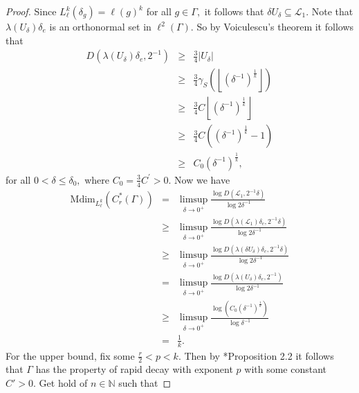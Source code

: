 \documentclass[a4paper,11pt,reqno]{amsart}
\theoremstyle{plain}
\theoremstyle{mainthmstyle}
\theoremstyle{named}
\numberwithin{equation}{section}
\newcommand{\Bea}{\begin{eqnarray*}}
\newcommand{\Eea}{\end{eqnarray*}}
\begin{document}
\begin{proof}
Since $L_{\ell}^{k} \left (\delta_{g} \right ) = \ell (g)^{k}$ for all $g \in \Gamma,$ it follows that $\delta U_{\delta} \subseteq \mathcal L_{1}.$ 
Note that $\lambda \left (U_{\delta} \right ) \delta_e$ is an orthonormal set in $\ell^2 (\Gamma).$ So by Voiculescu's theorem it follows that 
\Bea 
D \left (\lambda(U_{\delta})\delta_{e}, 2^{-1} \right ) 
& \geq & \frac {3} {4} \left \lvert U_{\delta} \right \rvert \\ 
& \geq & \frac {3} {4} \gamma_S \left (\left \lfloor \left (\delta^{-1} \right )^{\frac {1} {k}} \right \rfloor \right ) \\ 
& \geq & \frac {3} {4} C \left \lfloor \left (\delta^{-1} \right )^{\frac {1} {k}} \right \rfloor \\ & \geq & \frac {3} {4} C \left (\left (\delta^{-1} \right )^{\frac {1} {k}} - 1 \right ) \\ & \geq & C_0 \left (\delta^{-1} \right )^{\frac {1} {k}}, 
\Eea for all $0 < \delta \leq \delta_0,$ where $C_{0} = \frac {3} {4} C^{\prime} > 0.$ Now we have
\Bea \mathrm {Mdim}_{L_{\ell}^{k}} \left (C_{r}^{\ast} (\Gamma) \right ) & = & \limsup\limits_{\delta \to 0^{+}} \frac {\log D \left (\mathcal L_{1}, 2^{-1} \delta \right )} {\log 2 \delta^{-1}} \\ & \geq & \limsup\limits_{\delta \to 0^{+}} \frac {\log D \left (\lambda(\mathcal L_{1})\delta_{e}, 2^{-1} \delta \right )} {\log 2 \delta^{-1}} \\ & \geq & \limsup\limits_{\delta \to 0^{+}} \frac {\log D \left (\lambda(\delta U_{\delta})\delta_{e}, 2^{-1} \delta \right )} {\log 2 \delta^{-1}} \\ & = & \limsup\limits_{\delta \to 0^{+}} \frac {\log D \left (\lambda(U_{\delta})\delta_{e}, 2^{-1} \right )} {\log 2 \delta^{-1}} \\ 
& \geq & \limsup\limits_{\delta \to 0^{+}} \frac {\log (C_{0} \left (\delta^{-1}\right )^{\frac {1} {k}})} {\log \delta^{-1}} \\
& = & \frac {1} {k}. \Eea
For the upper bound, fix some $\frac {r} {2} < p < k.$ Then by \cite{nica2010degree}*{Proposition 2.2} it follows that $\Gamma$ has the property of rapid decay with exponent $p$ with some constant $C' > 0.$ Get hold of $n \in \mathbb N$ such that 

\end{proof}
\end{document}
